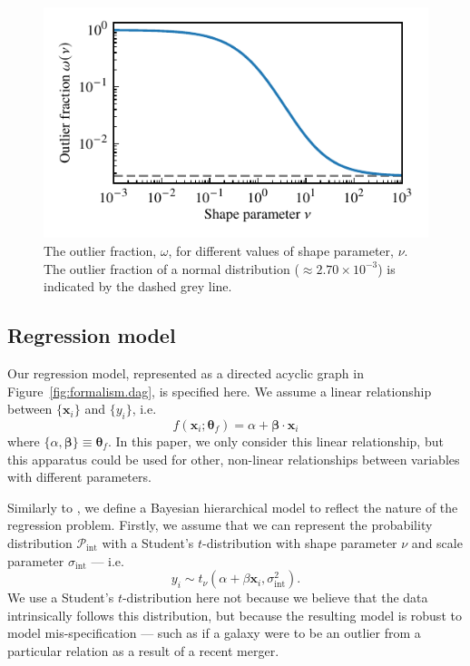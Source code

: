 \documentclass[fleqn,usenatbib]{rasti}
\newcommand{\studentt}[2]{t_\nu \left( #1, #2 \right)}
\newcommand{\depvar}{y_i}
\newcommand{\indepvars}{\boldsymbol{x}_i}
\newcommand{\intscttr}{\sigma_{\text{int}}}
\newcommand{\intercept}{\alpha}
\newcommand{\covariate}{\beta}
\begin{document}
\begin{figure}
	\includegraphics{graphics/outlier_frac.pdf}
    \caption{The outlier fraction, $\omega$, for different values of shape
    parameter, $\nu$. The outlier fraction of a normal distribution ($\approx
    2.70 \times 10^{-3}$) is indicated by the dashed grey line.}
    \label{fig:model.outlier_frac}
\end{figure}

\subsection{Regression model}
\label{sec:formalism.model}

Our regression model, represented as a directed acyclic graph in
Figure~\ref{fig:formalism.dag}, is specified here. We assume a linear
relationship between
$\{\boldsymbol{x}_i\}$ and $\{y_i\}$, i.e.
\begin{equation}
    f(\boldsymbol{x}_i; \boldsymbol{\theta}_f) =
        \alpha + \boldsymbol{\beta} \cdot \boldsymbol{x}_i
\end{equation}
where $\{\alpha, \boldsymbol{\beta}\} \equiv \boldsymbol{\theta}_f$. In this
paper, we only consider this linear relationship, but this apparatus could be
used for other, non-linear relationships between variables with different
parameters.

Similarly to \citet{Kelly:2007}, we define a Bayesian hierarchical model to
reflect the nature of the regression problem. Firstly, we assume that we can
represent the probability distribution $\mathcal P_{\text{int}}$ with a
Student's $t$-distribution with shape parameter $\nu$ and scale parameter
$\sigma_{\text{int}}$ --- i.e.
\begin{equation}
\depvar \sim \studentt{\intercept + \covariate \indepvars}{\intscttr^2}.
\end{equation}
We use a Student's $t$-distribution here not because we believe that the data
intrinsically follows this distribution, but because the resulting model is
robust to model mis-specification --- such as if a galaxy were
to be an outlier from a particular relation as a result of a recent merger.
\end{document}
